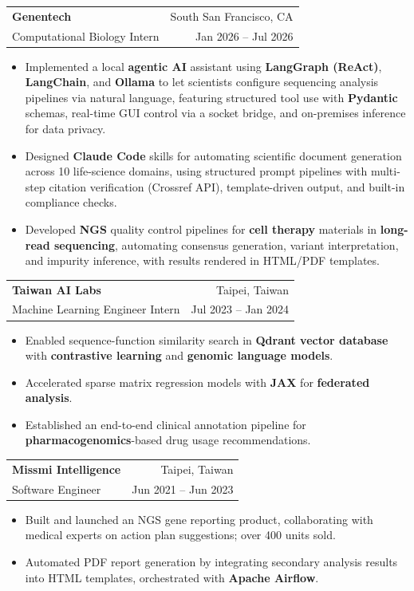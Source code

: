 \documentclass[letterpaper,11pt]{article}
\makeatletter
\newcommand{\entry}[4]{%
  \begin{tabular*}{\textwidth}{@{}l@{\extracolsep{\fill}}r@{}}
    \textbf{#1} & #2 \\
    #3 & #4 \\
  \end{tabular*}
}
\makeatother
\begin{document}
\entry
  {Genentech}{South San Francisco, CA}
  {Computational Biology Intern}{Jan 2026 -- Jul 2026}
\begin{itemize}
  \item Implemented a local \textbf{agentic AI} assistant using \textbf{LangGraph (ReAct)}, \textbf{LangChain}, and \textbf{Ollama} to let scientists configure sequencing analysis pipelines via natural language, featuring structured tool use with \textbf{Pydantic} schemas, real-time GUI control via a socket bridge, and on-premises inference for data privacy.
  \item Designed \textbf{Claude Code} skills for automating scientific document generation across 10 life-science domains, using structured prompt pipelines with multi-step citation verification (Crossref API), template-driven output, and built-in compliance checks.
  \item Developed \textbf{NGS} quality control pipelines for \textbf{cell therapy} materials in \textbf{long-read sequencing}, automating consensus generation, variant interpretation, and impurity inference, with results rendered in HTML/PDF templates.
\end{itemize}

\vspace{2pt}
\entry
  {Taiwan AI Labs}{Taipei, Taiwan}
  {Machine Learning Engineer Intern}{Jul 2023 -- Jan 2024}
\begin{itemize}
  \item Enabled sequence-function similarity search in \textbf{Qdrant vector database} with \textbf{contrastive learning} and \textbf{genomic language models}.
  \item Accelerated sparse matrix regression models with \textbf{JAX} for \textbf{federated analysis}.
  \item Established an end-to-end clinical annotation pipeline for \textbf{pharmacogenomics}-based drug usage recommendations.
\end{itemize}

\vspace{2pt}
\entry
  {Missmi Intelligence}{Taipei, Taiwan}
  {Software Engineer}{Jun 2021 -- Jun 2023}
\begin{itemize}
  \item Built and launched an NGS gene reporting product, collaborating with medical experts on action plan suggestions; over 400 units sold.
  \item Automated PDF report generation by integrating secondary analysis results into HTML templates, orchestrated with \textbf{Apache Airflow}.
\end{itemize}
\end{document}
